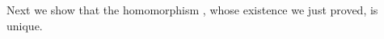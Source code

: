 \begin{code}
\AgdaSpace{}%
\AgdaSpace{}%
\AgdaSpace{}%
\AgdaSpace{}%
\AgdaSpace{}%
\AgdaSpace{}%
\AgdaSpace{}%
\AgdaSpace{}%
\AgdaSpace{}%
\<%
\\
%
\>[2]\AgdaSpace{}%
\AgdaSymbol{=}\AgdaSpace{}%
\<%
\\
%
\\[\AgdaEmptyExtraSkip]%
%
\>[2]\AgdaSpace{}%
\AgdaSymbol{:}\AgdaSpace{}%
\AgdaSpace{}%
\<%
\\
%
\>[2]\AgdaSpace{}%
\AgdaSymbol{=}\AgdaSpace{}%
\AgdaSpace{}%
\AgdaSpace{}%
\AgdaSpace{}%
\<%
\end{code}
\ccpad
Next we show that the homomorphism , whose existence we just proved, is unique.
\ccpad
